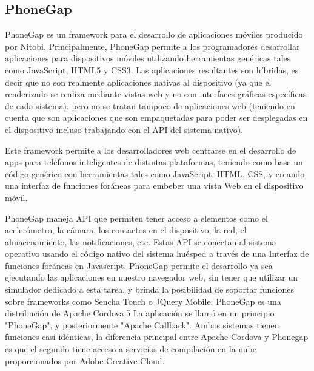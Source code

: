 \subsection{PhoneGap}
\setlength{\parskip}{5mm}
PhoneGap es un framework para el desarrollo de aplicaciones móviles producido por Nitobi. Principalmente, PhoneGap permite a los programadores desarrollar aplicaciones para dispositivos móviles utilizando herramientas genéricas tales como JavaScript, HTML5 y CSS3. Las aplicaciones resultantes son híbridas, es decir que no son realmente aplicaciones nativas al dispositivo (ya que el renderizado se realiza mediante vistas web y no con interfaces gráficas específicas de cada sistema), pero no se tratan tampoco de aplicaciones web (teniendo en cuenta que son aplicaciones que son empaquetadas para poder ser desplegadas en el dispositivo incluso trabajando con el API del sistema nativo).

Este framework permite a los desarrolladores web centrarse en el desarrollo de apps para teléfonos inteligentes de distintas plataformas, teniendo como base un código genérico con herramientas tales como JavaScript, HTML, CSS, y creando una interfaz de funciones foráneas para embeber una vista Web en el dispositivo móvil.

PhoneGap maneja API que permiten tener acceso a elementos como el acelerómetro, la cámara, los contactos en el dispositivo, la red, el almacenamiento, las notificaciones, etc. Estas API se conectan al sistema operativo usando el código nativo del sistema huésped a través de una Interfaz de funciones foráneas en Javascript.
PhoneGap permite el desarrollo ya sea ejecutando las aplicaciones en nuestro navegador web, sin tener que utilizar un simulador dedicado a esta tarea, y brinda la posibilidad de soportar funciones sobre frameworks como Sencha Touch o JQuery Mobile.
PhoneGap es una distribución de Apache Cordova.5 La aplicación se llamó en un principio "PhoneGap", y posteriormente "Apache Callback". Ambos sistemas tienen funciones casi idénticas, la diferencia principal entre Apache Cordova y Phonegap es que el segundo tiene acceso a servicios de compilación en la nube proporcionados por Adobe Creative Cloud.

